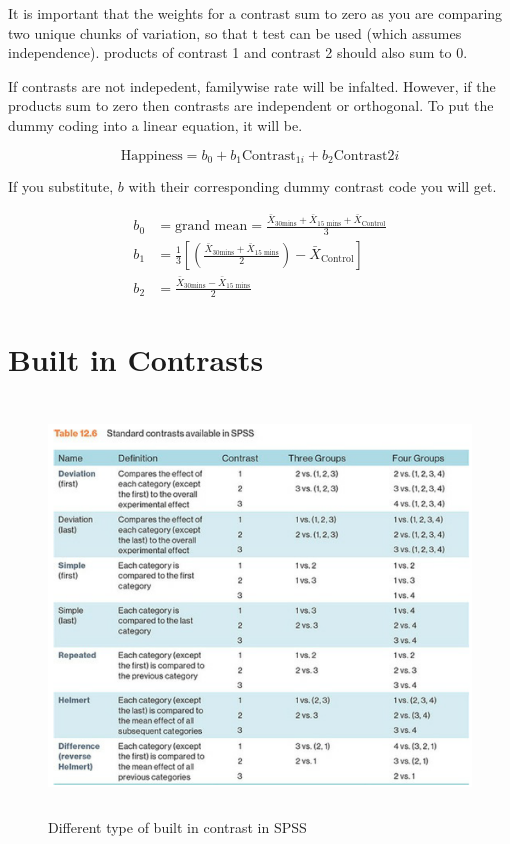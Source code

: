 It is important that the weights for a contrast sum to zero as you are comparing two unique chunks of variation, so that  t test can be used (which assumes independence).  products of contrast 1 and contrast 2 should also sum to 0. 

If contrasts are not indepedent, familywise rate will be infalted. However, if the products sum to zero then contrasts are independent or orthogonal. 
\clearpage
To put the dummy coding into a linear equation, it will be. 

\begin{equation}
\text{Happiness} = b_0 + b_1\text{Contrast}_{1i} + b_2\text{Contrast}{2i}
\end{equation}

If you substitute, $b$ with their corresponding dummy contrast code you will get. 

\begin{equation}
\begin{split}
b_0 & = \text{grand mean} = \frac{\bar{X}_{\text{30mins}} + \bar{X}_{\text{15 mins}} + \bar{X}_{\text{Control}}}{3} \\
b_1 & = \frac{1}{3}[(\frac{\bar{X}_{\text{30mins}} + \bar{X}_{\text{15 mins}}}{2}) - \bar{X}_{\text{Control}}] \\
b_2 & = \frac{\bar{X}_{\text{30mins}} - \bar{X}_{\text{15 mins}}}{2}
\end{split}
\end{equation}

\clearpage
\section{Built in Contrasts}

\begin{figure}[h]
	\includegraphics[width=1\textwidth,height=110mm]{Chapter 12 GLM 1 Comparing Several Independent Means ANOVA/builtincontrast.PNG}
	\caption{Different type of built in contrast in SPSS}
\end{figure}

